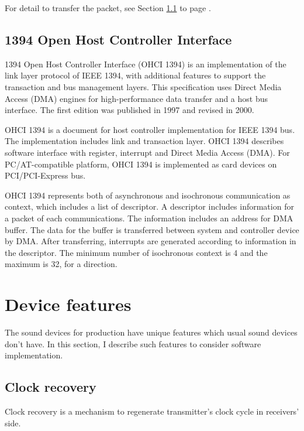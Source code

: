 \documentclass[onecolumn]{article}
\begin{document}
For detail to transfer the packet, see Section \ref{sec:clock-recovery} to page \pageref{sec:clock-recovery}.

\subsection{1394 Open Host Controller Interface}
\label{ohci-1394}

1394 Open Host Controller Interface (OHCI 1394) is an implementation of the link layer protocol of IEEE 1394, with additional features to support the transaction and bus management layers. This specification uses Direct Media Access (DMA) engines for high-performance data transfer and a host bus interface. The first edition was published in 1997\cite{ohci1394-1} and revised in 2000\cite{ohci1394-1-1}.

OHCI 1394 is a document for host controller implementation for IEEE 1394 bus. The implementation includes link and transaction layer. OHCI 1394 describes software interface with register, interrupt and Direct Media Access (DMA). For PC/AT-compatible platform, OHCI 1394 is implemented as card devices on PCI/PCI-Express bus.

OHCI 1394 represents both of asynchronous and isochronous communication as context, which includes a list of descriptor. A descriptor includes information for a packet of each communications. The information includes an address for DMA buffer. The data for the buffer is transferred between system and controller device by DMA. After transferring, interrupts are generated according to information in the descriptor. The minimum number of isochronous context is 4 and the maximum is 32, for a direction.

\section{Device features}

The sound devices for production have unique features which usual sound devices don't have. In this section, I describe such features to consider software implementation.

\subsection{Clock recovery}
\label{sec:clock-recovery}

Clock recovery is a mechanism to regenerate transmitter's clock cycle in receivers' side.
\end{document}
